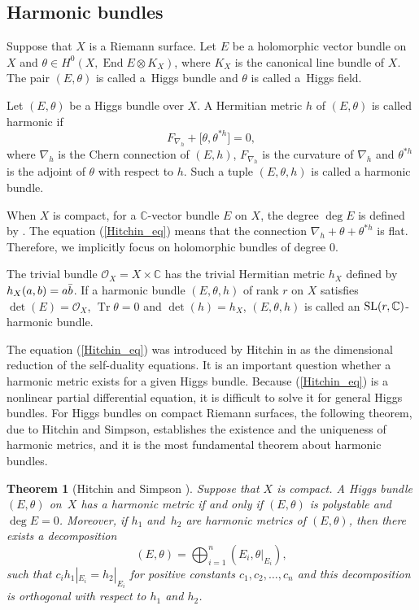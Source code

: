 \documentclass[pdftex]{sigma}
\numberwithin{equation}{section}
\newtheorem{Theorem}{Theorem}[section]
\newcommand{\C}{\mathbb{C}}
\newcommand{\End}{\operatorname{End}}
\newcommand{\Tr}{\operatorname{Tr}}
\newcommand{\strsheaf}{\mathcal{O}}
\begin{document}
\subsection{Harmonic bundles}
Suppose that $X$ is a Riemann surface. Let $E$ be a holomorphic vector bundle on $X$ and ${\theta\in H^0(X,\End{E}\otimes K_X)}$, where $K_X$ is the canonical line bundle of $X$. The pair $(E,\theta)$ is called a~Higgs bundle and $\theta$ is called a~Higgs field.
\begin{Definition}
 Let $(E,\theta)$ be a Higgs bundle over $X$. A Hermitian metric $h$ of $(E,\theta)$ is called harmonic if
 \begin{equation}\label{Hitchin_eq}
 F_{\nabla_h} + \bigl[\theta,\theta^{\ast h}\bigr] = 0,
 \end{equation}
 where $\nabla_h$ is the Chern connection of $(E,h)$, $F_{\nabla_h}$ is the curvature of $\nabla_h$ and $\theta^{\ast h}$ is the adjoint of $\theta$ with respect to $h$. Such a tuple $(E,\theta,h)$ is called a harmonic bundle.
\end{Definition}
\begin{Remark}
 When $X$ is compact, for a $\C$-vector bundle $E$ on $X$, the degree $\deg{E}$ is defined by .
 The equation (\ref{Hitchin_eq}) means that the connection $\nabla_h + \theta + \theta^{*h}$ is flat. Therefore, we implicitly focus on holomorphic bundles of degree 0.
\end{Remark}
The trivial bundle $\strsheaf_X = X\times \C$ has the trivial Hermitian metric $h_X$ defined by $h_X(a,b) = a\Bar{b}$. If a harmonic bundle $(E,\theta,h)$ of rank $r$ on $X$ satisfies $\det(E) = \strsheaf_X$, $\Tr{\theta}=0$ and $\det(h) = h_X$, $(E,\theta,h)$ is called an ${\rm SL}(r,\C)$-harmonic bundle.

The equation (\ref{Hitchin_eq}) was introduced by Hitchin in \cite{Hi1} as the dimensional reduction of the self-duality equations. It is an important question whether a harmonic metric exists for a given Higgs bundle. Because (\ref{Hitchin_eq}) is a nonlinear partial differential equation, it is difficult to solve it for general Higgs bundles. For Higgs bundles on compact Riemann surfaces, the following theorem, due to Hitchin and Simpson, establishes the existence and the uniqueness of harmonic metrics, and it is the most fundamental theorem about harmonic bundles.
\begin{Theorem}[Hitchin \cite{Hi1} and Simpson \cite{Si1}]\label{Hitchin_thm1}
 Suppose that $X$ is compact. A Higgs bundle $(E,\theta)$ on~$X$ has a harmonic metric if and only if $(E,\theta)$ is polystable and $\deg{E}=0$. Moreover, if $h_1$ and~$h_2$ are harmonic metrics of $(E,\theta)$, then there exists a decomposition
 \begin{equation*}
 (E,\theta) = \bigoplus_{i=1}^{n} (E_i,\theta|_{E_i}),
 \end{equation*}
 such that $c_i h_1|_{E_i} = h_2|_{E_i}$ for positive constants $c_1,c_2,\ldots,c_n$ and this decomposition is orthogonal with respect to $h_1$ and $h_2$.
\end{Theorem}
\end{document}
